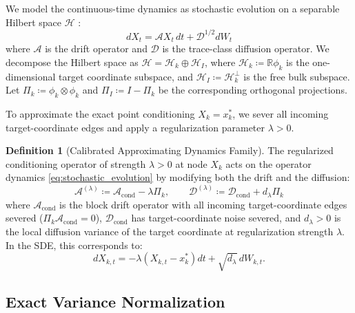 \documentclass[11pt]{amsart}
\theoremstyle{plain}
\theoremstyle{definition}
\newtheorem{definition}[theorem]{Definition}
\theoremstyle{remark}
\newcommand{\cond}{\operatorname{cond}}
\begin{document}
We model the continuous-time dynamics as stochastic evolution on a separable Hilbert space $\mathcal{H}$ \cite{daprato2014stochastic}:
\begin{equation}
  \label{eq:stochastic_evolution}
  dX_t = \mathcal{A} X_t \, dt + \mathcal{D}^{1/2} dW_t
\end{equation}
where $\mathcal{A}$ is the drift operator and $\mathcal{D}$ is the trace-class diffusion operator. We decompose the Hilbert space as $\mathcal{H} = \mathcal{H}_k \oplus \mathcal{H}_I$, where $\mathcal{H}_k \coloneqq \mathbb{R}\phi_k$ is the one-dimensional target coordinate subspace, and $\mathcal{H}_I \coloneqq \mathcal{H}_k^\perp$ is the free bulk subspace. Let $\Pi_k \coloneqq \phi_k \otimes \phi_k$ and $\Pi_I \coloneqq I - \Pi_k$ be the corresponding orthogonal projections.

To approximate the exact point conditioning $X_k = x_k^*$, we sever all incoming target-coordinate edges and apply a regularization parameter $\lambda > 0$.

\begin{definition}[Calibrated Approximating Dynamics Family]
  \label{def:soft_do}
  The regularized conditioning operator of strength $\lambda > 0$ at node $X_k$ acts on the operator dynamics \eqref{eq:stochastic_evolution} by modifying both the drift and the diffusion:
  \begin{equation}
    \label{eq:soft_do_sde}
    \mathcal{A}^{(\lambda)} \coloneqq \mathcal{A}_{\cond} - \lambda \Pi_k, \qquad
    \mathcal{D}^{(\lambda)} \coloneqq \mathcal{D}_{\cond} + d_\lambda \Pi_k
  \end{equation}
  where $\mathcal{A}_{\cond}$ is the block drift operator with all incoming target-coordinate edges severed ($\Pi_k \mathcal{A}_{\cond} = 0$), $\mathcal{D}_{\cond}$ has target-coordinate noise severed, and $d_\lambda > 0$ is the local diffusion variance of the target coordinate at regularization strength $\lambda$. In the SDE, this corresponds to:
  \begin{equation}
    \label{eq:soft_do_sde_general}
    dX_{k,t} = -\lambda (X_{k,t} - x_k^*) dt + \sqrt{d_\lambda}\, dW_{k,t}.
  \end{equation}
\end{definition}

\subsection{Exact Variance Normalization}
\label{sec:setup:calibration}
\end{document}
